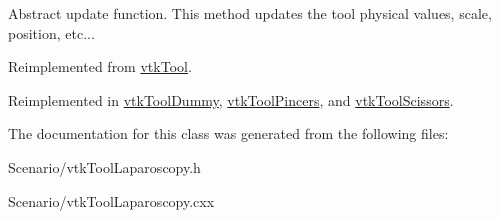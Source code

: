 Abstract update function. This method updates the tool physical values, scale, position, etc... 

Reimplemented from \hyperlink{classvtkTool_a0f1b6e049d7ff5420f4f4604434a9da7}{vtkTool}.

Reimplemented in \hyperlink{classvtkToolDummy_a19cda726ffda0a3955e519d7b42e4882}{vtkToolDummy}, \hyperlink{classvtkToolPincers_a57986aee2bcfa04472410cd7bf5c7929}{vtkToolPincers}, and \hyperlink{classvtkToolScissors_afe574b6b9e809f746308a157b6525c4b}{vtkToolScissors}.

The documentation for this class was generated from the following files:\begin{DoxyCompactItemize}
\item 
Scenario/vtkToolLaparoscopy.h\item 
Scenario/vtkToolLaparoscopy.cxx\end{DoxyCompactItemize}
